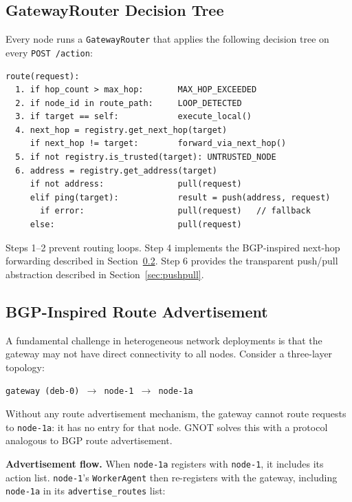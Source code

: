 \documentclass[10pt,twocolumn]{article}
\begin{document}
\subsection{GatewayRouter Decision Tree}

Every node runs a \texttt{GatewayRouter} that applies the following
decision tree on every \texttt{POST /action}:

\begin{lstlisting}[caption={Routing decision logic (pseudocode)}]
route(request):
  1. if hop_count > max_hop:       MAX_HOP_EXCEEDED
  2. if node_id in route_path:     LOOP_DETECTED
  3. if target == self:            execute_local()
  4. next_hop = registry.get_next_hop(target)
     if next_hop != target:        forward_via_next_hop()
  5. if not registry.is_trusted(target): UNTRUSTED_NODE
  6. address = registry.get_address(target)
     if not address:               pull(request)
     elif ping(target):            result = push(address, request)
       if error:                   pull(request)   // fallback
     else:                         pull(request)
\end{lstlisting}

Steps 1--2 prevent routing loops. Step 4 implements the BGP-inspired
next-hop forwarding described in Section~\ref{sec:bgp}. Step 6 provides
the transparent push/pull abstraction described in
Section~\ref{sec:pushpull}.

\subsection{BGP-Inspired Route Advertisement}
\label{sec:bgp}

A fundamental challenge in heterogeneous network deployments is that the
gateway may not have direct connectivity to all nodes. Consider a
three-layer topology:

\begin{center}
\texttt{gateway (deb-0) $\to$ node-1 $\to$ node-1a}
\end{center}

Without any route advertisement mechanism, the gateway cannot route
requests to \texttt{node-1a}: it has no entry for that node. GNOT
solves this with a protocol analogous to BGP route advertisement.

\textbf{Advertisement flow.} When \texttt{node-1a} registers with
\texttt{node-1}, it includes its action list. \texttt{node-1}'s
\texttt{WorkerAgent} then re-registers with the gateway, including
\texttt{node-1a} in its \texttt{advertise\_routes} list:
\end{document}
